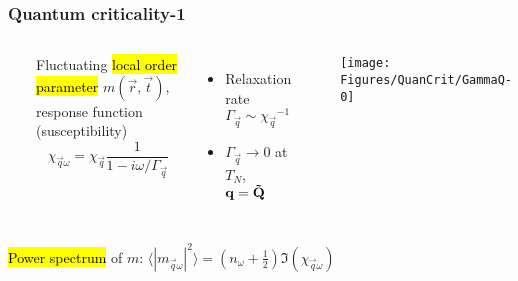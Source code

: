 

\begin{frame}[label=quancrit1]
\frametitle{Quantum criticality-1}

\begin{columns}[t]
\centerline{~}

Fluctuating \hl{local order parameter} $m(\vec r, \vec t)$, response
function (susceptibility)
\[ \chi_{\vec q \omega} = \chi_{\vec q} \frac{1}{1-i\omega/\Gamma_\vec q} \]

\begin{itemize}
\item Relaxation rate $\Gamma_\vec q \sim {\chi_\vec q}^{-1}$
\item $\Gamma_\vec q \rightarrow 0$ at $T_N$, $\bf q=\vec Q$
\end{itemize}

\centerline{~}
\texttt{[image: \\Figures/QuanCrit/GammaQ-0]}
\end{columns}

\vspace{4ex}
\centerline{\hl{Power spectrum} of $m$:
$\langle |m_{\vec q\omega}|^2 \rangle = \left(n_\omega + \frac{1}{2}\right) \Im(\chi_{\vec q \omega})$}

\end{frame}


